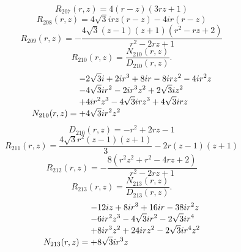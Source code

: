 \documentclass[11pt,a4paper]{article}
\begin{document}
\begin{equation}
R_{207}(r,z)=4 \left(r - z\right) \left(3 r z + 1\right)
\label{eq:cat-rational-207}
\end{equation}
\begin{equation}
R_{208}(r,z)=4 \sqrt{3} i r z \left(r - z\right) - 4 i r \left(r - z\right)
\label{eq:cat-rational-208}
\end{equation}
\begin{equation}
R_{209}(r,z)=- \frac{4 \sqrt{3} \left(z - 1\right) \left(z + 1\right) \left(r^{2} - r z + 2\right)}{r^{2} - 2 r z + 1}
\label{eq:cat-rational-209}
\end{equation}
\begin{equation}
R_{210}(r,z)=\frac{N_{210}(r,z)}{D_{210}(r,z)}.
\label{eq:cat-rational-210}
\end{equation}
\begin{equation}
N_{210}(r,z)=\shortstack[l]{$\displaystyle  - 2 \sqrt{3} i + 2 i r^{3} + 8 i r - 8 i r z^{2} - 4 i r^{2} z$\\
$\displaystyle  - 4 \sqrt{3} i r^{2} - 2 i r^{3} z^{2} + 2 \sqrt{3} i z^{2}$\\
$\displaystyle  + 4 i r^{2} z^{3} - 4 \sqrt{3} i r z^{3} + 4 \sqrt{3} i r z$\\
$\displaystyle  + 4 \sqrt{3} i r^{2} z^{2}$}
\label{eq:cat-numerator-210}
\end{equation}
\begin{equation}
D_{210}(r,z)=- r^{2} + 2 r z - 1
\label{eq:cat-denominator-210}
\end{equation}
\begin{equation}
R_{211}(r,z)=\frac{4 \sqrt{3} r^{2} \left(z - 1\right) \left(z + 1\right)}{3} - 2 r \left(z - 1\right) \left(z + 1\right)
\label{eq:cat-rational-211}
\end{equation}
\begin{equation}
R_{212}(r,z)=- \frac{8 \left(r^{2} z^{2} + r^{2} - 4 r z + 2\right)}{r^{2} - 2 r z + 1}
\label{eq:cat-rational-212}
\end{equation}
\begin{equation}
R_{213}(r,z)=\frac{N_{213}(r,z)}{D_{213}(r,z)}.
\label{eq:cat-rational-213}
\end{equation}
\begin{equation}
N_{213}(r,z)=\shortstack[l]{$\displaystyle  - 12 i z + 8 i r^{3} + 16 i r - 38 i r^{2} z$\\
$\displaystyle  - 6 i r^{2} z^{3} - 4 \sqrt{3} i r^{2} - 2 \sqrt{3} i r^{4}$\\
$\displaystyle  + 8 i r^{3} z^{2} + 24 i r z^{2} - 2 \sqrt{3} i r^{4} z^{2}$\\
$\displaystyle  + 8 \sqrt{3} i r^{3} z$}
\label{eq:cat-numerator-213}
\end{equation}
\end{document}
